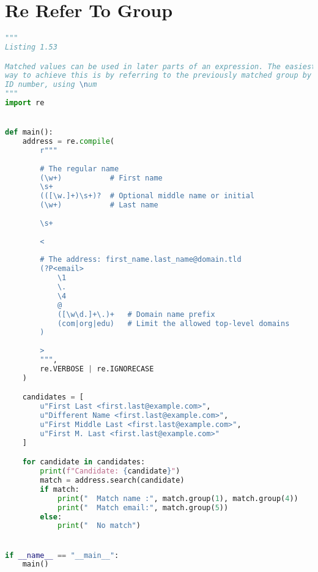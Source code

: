 \documentclass[a4paper,landscape]{report}
\begin{document}
\section{Re Refer To Group}
\begin{lstlisting}[language=Python]
"""
Listing 1.53

Matched values can be used in later parts of an expression. The easiest
way to achieve this is by referring to the previously matched group by
ID number, using \num
"""
import re


def main():
    address = re.compile(
        r"""
        
        # The regular name
        (\w+)           # First name
        \s+
        (([\w.]+)\s+)?  # Optional middle name or initial
        (\w+)           # Last name
        
        \s+
        
        <
        
        # The address: first_name.last_name@domain.tld
        (?P<email>
            \1
            \.
            \4
            @
            ([\w\d.]+\.)+   # Domain name prefix
            (com|org|edu)   # Limit the allowed top-level domains
        )
        
        >
        """,
        re.VERBOSE | re.IGNORECASE
    )

    candidates = [
        u"First Last <first.last@example.com>",
        u"Different Name <first.last@example.com>",
        u"First Middle Last <first.last@example.com>",
        u"First M. Last <first.last@example.com>"
    ]

    for candidate in candidates:
        print(f"Candidate: {candidate}")
        match = address.search(candidate)
        if match:
            print("  Match name :", match.group(1), match.group(4))
            print("  Match email:", match.group(5))
        else:
            print("  No match")


if __name__ == "__main__":
    main()

\end{lstlisting}
\end{document}
